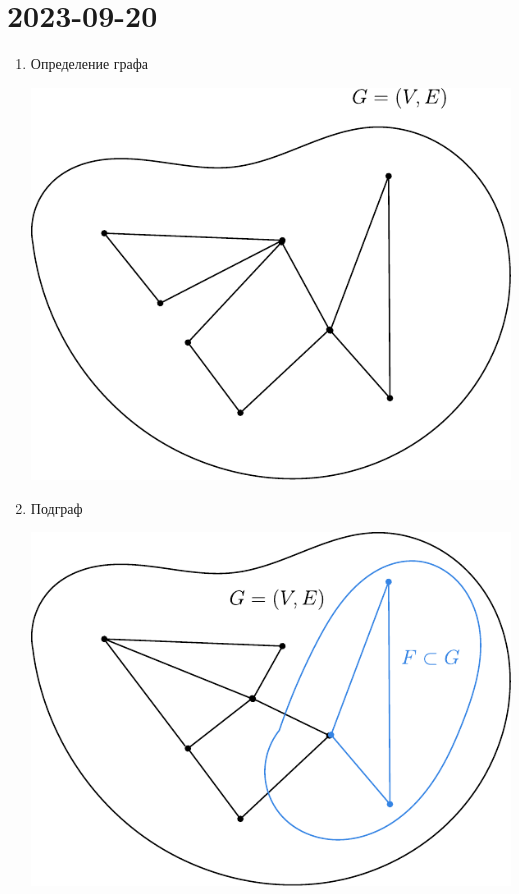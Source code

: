 \section{2023-09-20}

\begin{enumerate}
	\item Определение графа 
		\begin{center}
			\includegraphics{images/pic1}
		\end{center}
	\item Подграф
		\begin{center}
			\includegraphics{images/pic2}
		\end{center}
	
 
\end{enumerate}
